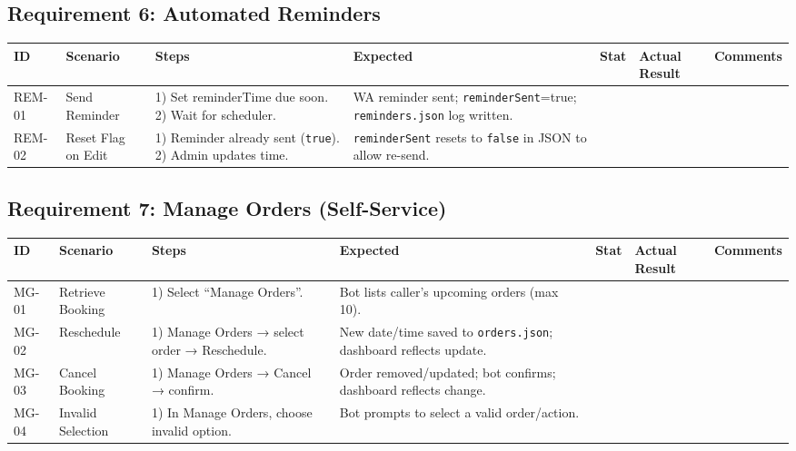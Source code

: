 ﻿\documentclass[11pt, a4paper]{article}
\begin{document}
\subsection{Requirement 6: Automated Reminders}
\begin{longtable}{|p{}|p{}|p{}|p{}|p{}|p{}|p{}|}
    \hline
    \rowcolor{headergray} \textbf{ID} & \textbf{Scenario} & \textbf{Steps} & \textbf{Expected} & \textbf{Stat} & \textbf{Actual Result} & \textbf{Comments} \\ \hline
    \endhead

    REM-01 & Send Reminder & 1) Set reminderTime due soon. 2) Wait for scheduler. & WA reminder sent; \texttt{reminderSent}=true; \texttt{reminders.json} log written. & & & \\ \hline

    REM-02 & Reset Flag on Edit & 1) Reminder already sent (\texttt{true}). 2) Admin updates time. & \texttt{reminderSent} resets to \texttt{false} in JSON to allow re-send. & & & \\ \hline
\end{longtable}

\subsection{Requirement 7: Manage Orders (Self-Service)}
\begin{longtable}{|p{}|p{}|p{}|p{}|p{}|p{}|p{}|}
    \hline
    \rowcolor{headergray} \textbf{ID} & \textbf{Scenario} & \textbf{Steps} & \textbf{Expected} & \textbf{Stat} & \textbf{Actual Result} & \textbf{Comments} \\ \hline
    \endhead

    MG-01 & Retrieve Booking & 1) Select “Manage Orders”. & Bot lists caller’s upcoming orders (max 10). & & & \\ \hline

    MG-02 & Reschedule & 1) Manage Orders → select order → Reschedule. & New date/time saved to \texttt{orders.json}; dashboard reflects update. & & & \\ \hline

    MG-03 & Cancel Booking & 1) Manage Orders → Cancel → confirm. & Order removed/updated; bot confirms; dashboard reflects change. & & & \\ \hline

    MG-04 & Invalid Selection & 1) In Manage Orders, choose invalid option. & Bot prompts to select a valid order/action. & & & \\ \hline
\end{longtable}
\end{document}

